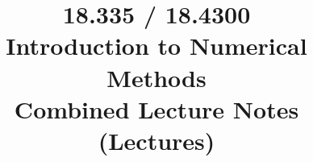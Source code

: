 \documentclass[12pt]{article}
\begin{document}
\title{18.335 / 18.4300 \\ Introduction to Numerical Methods \\
       Combined Lecture Notes (Lectures)}
\author{}
\date{}
\maketitle

\tableofcontents
\newpage

\end{document}
